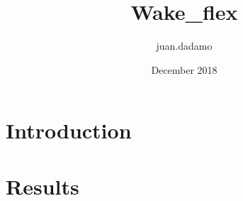 \documentclass{article}
\title{Wake_flex}
\author{juan.dadamo}
\date{December 2018}
\begin{document}
\maketitle

\section{Introduction}
\section{Results}
\end{document}
